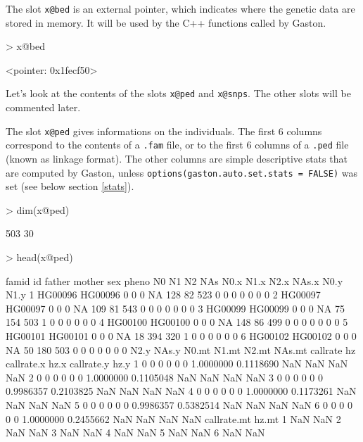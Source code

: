 \documentclass{article}
\renewenvironment{Schunk}{\vspace{\topsep}}{\vspace{\topsep}}
\begin{document}
  The slot \verb!x@bed! is an external pointer, which indicates where the genetic data are stored in
  memory. It will be used by the C++ functions called by Gaston. 
\begin{Schunk}
\begin{Sinput}
> x@bed
\end{Sinput}
\begin{Soutput}
<pointer: 0x1fecf50>
\end{Soutput}
\end{Schunk}

  Let's look at the contents of the slots \verb!x@ped! and \verb!x@snps!.
  The other slots will be commented later.

  The slot \verb!x@ped! gives informations on the individuals. 
  The first 6 columns correspond to the contents of a \verb!.fam! file, or to the first 6 columns of a \verb!.ped! file 
  (known as linkage format). The other columns are simple descriptive
  stats that are computed by Gaston, unless \verb!options(gaston.auto.set.stats = FALSE)!
  was set (see below section \ref{stats}).

\begin{Schunk}
\begin{Sinput}
> dim(x@ped)
\end{Sinput}
\begin{Soutput}
[1] 503  30
\end{Soutput}
\begin{Sinput}
> head(x@ped)
\end{Sinput}
\begin{Soutput}
    famid      id father mother sex pheno  N0  N1  N2 NAs N0.x N1.x N2.x NAs.x N0.y N1.y
1 HG00096 HG00096      0      0   0    NA 128  82 523   0    0    0    0     0    0    0
2 HG00097 HG00097      0      0   0    NA 109  81 543   0    0    0    0     0    0    0
3 HG00099 HG00099      0      0   0    NA  75 154 503   1    0    0    0     0    0    0
4 HG00100 HG00100      0      0   0    NA 148  86 499   0    0    0    0     0    0    0
5 HG00101 HG00101      0      0   0    NA  18 394 320   1    0    0    0     0    0    0
6 HG00102 HG00102      0      0   0    NA  50 180 503   0    0    0    0     0    0    0
  N2.y NAs.y N0.mt N1.mt N2.mt NAs.mt  callrate        hz callrate.x hz.x callrate.y hz.y
1    0     0     0     0     0      0 1.0000000 0.1118690        NaN  NaN        NaN  NaN
2    0     0     0     0     0      0 1.0000000 0.1105048        NaN  NaN        NaN  NaN
3    0     0     0     0     0      0 0.9986357 0.2103825        NaN  NaN        NaN  NaN
4    0     0     0     0     0      0 1.0000000 0.1173261        NaN  NaN        NaN  NaN
5    0     0     0     0     0      0 0.9986357 0.5382514        NaN  NaN        NaN  NaN
6    0     0     0     0     0      0 1.0000000 0.2455662        NaN  NaN        NaN  NaN
  callrate.mt hz.mt
1         NaN   NaN
2         NaN   NaN
3         NaN   NaN
4         NaN   NaN
5         NaN   NaN
6         NaN   NaN
\end{Soutput}
\end{Schunk}
\end{document}
